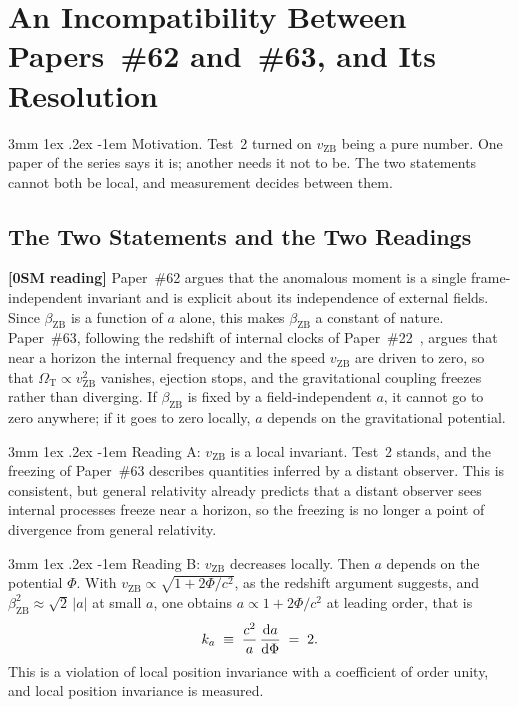\documentclass[%
 reprint, amsmath,amssymb, aps, prb, ]{revtex4-2}
\makeatletter
\numberwithin{equation}{section}
\renewcommand\paragraph{%
  \@startsection{paragraph}{4}{\z@}%
    {3mm \@plus 1ex \@minus .2ex}%
    {-1em}%
    {\normalfont\normalsize\itshape}}
\newcommand{\vZB}{v_{\text{ZB}}}
\newcommand{\betaZB}{\beta_{\text{ZB}}}
\newcommand{\OmT}{\Omega_{\text{T}}}
\makeatother
\begin{document}
\section{An Incompatibility Between Papers~\#62 and~\#63, and Its Resolution}
\label{sec:tension}

\paragraph{Motivation.} Test~2 turned on $\vZB$ being a pure number. One paper of the series says it is; another needs it not to be. The two statements cannot both be local, and measurement decides between them.

\subsection{The Two Statements and the Two Readings}
\label{subsec:two_statements}

\textbf{[0SM reading]} Paper~\#62 argues that the anomalous moment is a single frame-independent invariant and is explicit about its independence of external fields. Since $\betaZB$ is a function of $a$ alone, this makes $\betaZB$ a constant of nature. Paper~\#63, following the redshift of internal clocks of Paper~\#22~\cite{hanamura22}, argues that near a horizon the internal frequency and the speed $\vZB$ are driven to zero, so that $\OmT \propto \vZB^{2}$ vanishes, ejection stops, and the gravitational coupling freezes rather than diverging. If $\betaZB$ is fixed by a field-independent $a$, it cannot go to zero anywhere; if it goes to zero locally, $a$ depends on the gravitational potential.

\paragraph{Reading A: $\vZB$ is a local invariant.} Test~2 stands, and the freezing of Paper~\#63 describes quantities inferred by a distant observer. This is consistent, but general relativity already predicts that a distant observer sees internal processes freeze near a horizon, so the freezing is no longer a point of divergence from general relativity.

\paragraph{Reading B: $\vZB$ decreases locally.} Then $a$ depends on the potential $\Phi$. With $\vZB \propto \sqrt{1 + 2\Phi/c^{2}}$, as the redshift argument suggests, and $\betaZB^{2} \approx \sqrt{2}\,\lvert a\rvert$ at small $a$, one obtains $a \propto 1 + 2\Phi/c^{2}$ at leading order, that is
\begin{equation}
k_{a} \;\equiv\; \frac{c^{2}}{a}\,\dv{a}{\Phi} \;=\; 2 .
\label{eq:ka}
\end{equation}
This is a violation of local position invariance with a coefficient of order unity, and local position invariance is measured.
\end{document}

